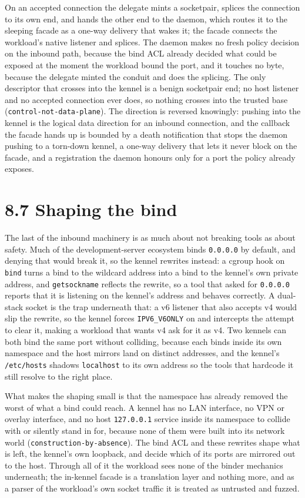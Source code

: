 On an accepted connection the delegate mints a socketpair, splices the
connection to its own end, and hands the other end to the daemon, which
routes it to the sleeping facade as a one-way delivery that wakes it;
the facade connects the workload's native listener and splices. The
daemon makes no fresh policy decision on the inbound path, because the
bind ACL already decided what could be exposed at the moment the
workload bound the port, and it touches no byte, because the delegate
minted the conduit and does the splicing. The only descriptor that
crosses into the kennel is a benign socketpair end; no host listener and
no accepted connection ever does, so nothing crosses into the trusted
base (\texttt{control-not-data-plane}). The direction is reversed
knowingly: pushing into the kennel is the logical data direction for an
inbound connection, and the callback the facade hands up is bounded by a
death notification that stops the daemon pushing to a torn-down kennel,
a one-way delivery that lets it never block on the facade, and a
registration the daemon honours only for a port the policy already
exposes.

\hypertarget{shaping-the-bind}{%
\section{8.7 Shaping the bind}\label{shaping-the-bind}}

The last of the inbound machinery is as much about not breaking tools as
about safety. Much of the development-server ecosystem binds
\texttt{0.0.0.0} by default, and denying that would break it, so the
kennel rewrites instead: a cgroup hook on \texttt{bind} turns a bind to
the wildcard address into a bind to the kennel's own private address,
and \texttt{getsockname} reflects the rewrite, so a tool that asked for
\texttt{0.0.0.0} reports that it is listening on the kennel's address
and behaves correctly. A dual-stack socket is the trap underneath that:
a v6 listener that also accepts v4 would slip the rewrite, so the kennel
forces \texttt{IPV6\_V6ONLY} on and intercepts the attempt to clear it,
making a workload that wants v4 ask for it as v4. Two kennels can both
bind the same port without colliding, because each binds inside its own
namespace and the host mirrors land on distinct addresses, and the
kennel's \texttt{/etc/hosts} shadows \texttt{localhost} to its own
address so the tools that hardcode it still resolve to the right place.

What makes the shaping small is that the namespace has already removed
the worst of what a bind could reach. A kennel has no LAN interface, no
VPN or overlay interface, and no host \texttt{127.0.0.1} service inside
its namespace to collide with or silently stand in for, because none of
them were built into its network world
(\texttt{construction-by-absence}). The bind ACL and these rewrites
shape what is left, the kennel's own loopback, and decide which of its
ports are mirrored out to the host. Through all of it the workload sees
none of the binder mechanics underneath; the in-kennel facade is a
translation layer and nothing more, and as a parser of the workload's
own socket traffic it is treated as untrusted and fuzzed.
